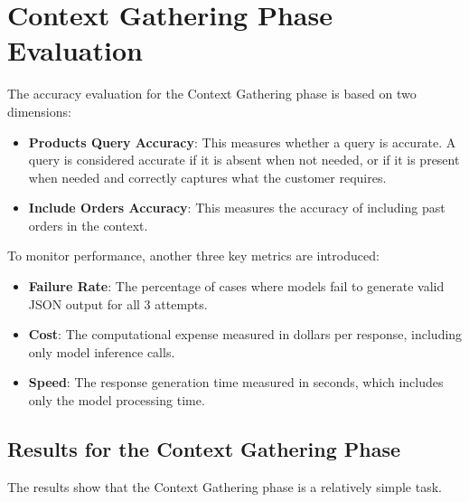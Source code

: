 \section{Context Gathering Phase Evaluation}
\label{sec:cg-eval}

The accuracy evaluation for the Context Gathering phase is based on two dimensions:
\begin{itemize}
    \item \textbf{Products Query Accuracy}: This measures whether a query is accurate. A query is considered accurate if it is absent when not needed, or if it is present when needed and correctly captures what the customer requires.
    \item \textbf{Include Orders Accuracy}: This measures the accuracy of including past orders in the context.
\end{itemize}
To monitor performance, another three key metrics are introduced:
\begin{itemize}
    \item \textbf{Failure Rate}: The percentage of cases where models fail to generate valid JSON output for all 3 attempts.
    \item \textbf{Cost}: The computational expense measured in dollars per response, including only model inference calls.
    \item \textbf{Speed}: The response generation time measured in seconds, which includes only the model processing time.
\end{itemize}

\subsection{Results for the Context Gathering Phase}
\label{sec:cg-results}

The results show that the Context Gathering phase is a relatively simple task.

